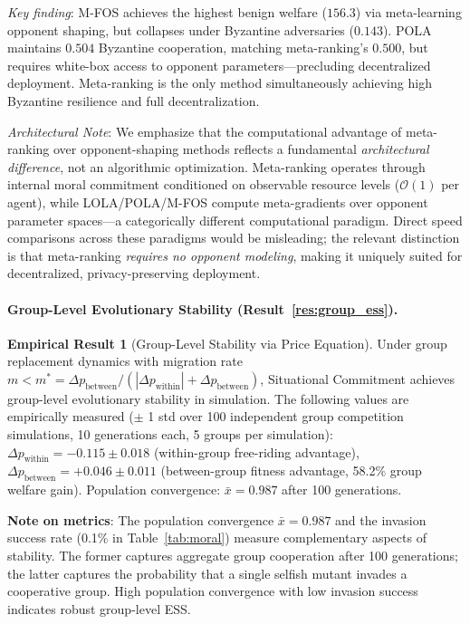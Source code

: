 \documentclass{article}
\begin{document}
\noindent\textit{Key finding}: M-FOS achieves the highest benign welfare ($156.3$) via meta-learning opponent shaping, but collapses under Byzantine adversaries ($0.143$).
POLA maintains $0.504$ Byzantine cooperation, matching meta-ranking's $0.500$, but requires white-box access to opponent parameters---precluding decentralized deployment.
Meta-ranking is the only method simultaneously achieving high Byzantine resilience and full decentralization.

\noindent\textit{Architectural Note}: We emphasize that the computational advantage of meta-ranking over opponent-shaping methods reflects a fundamental \emph{architectural difference}, not an algorithmic optimization.
Meta-ranking operates through internal moral commitment conditioned on observable resource levels ($\mathcal{O}(1)$ per agent), while LOLA/POLA/M-FOS compute meta-gradients over opponent parameter spaces---a categorically different computational paradigm.
Direct speed comparisons across these paradigms would be misleading; the relevant distinction is that meta-ranking \emph{requires no opponent modeling}, making it uniquely suited for decentralized, privacy-preserving deployment.

\paragraph{Group-Level Evolutionary Stability (Result~\ref{res:group_ess}).}

\noindent\textbf{Empirical Result 1} (Group-Level Stability via Price Equation).
\label{res:group_ess}
Under group replacement dynamics with migration rate $m < m^* = \Delta p_{\text{between}} / (|\Delta p_{\text{within}}| + \Delta p_{\text{between}})$, Situational Commitment achieves group-level evolutionary stability in simulation. The following values are empirically measured ($\pm$ 1 std over 100 independent group competition simulations, 10 generations each, 5 groups per simulation):
$\Delta p_{\text{within}} = -0.115 \pm 0.018$ (within-group free-riding advantage),
$\Delta p_{\text{between}} = +0.046 \pm 0.011$ (between-group fitness advantage, 58.2\% group welfare gain).
Population convergence: $\bar{x} = 0.987$ after 100 generations.

\noindent \textbf{Note on metrics}: The population convergence $\bar{x} = 0.987$ and the invasion success rate (0.1\% in Table~\ref{tab:moral}) measure complementary aspects of stability.
The former captures aggregate group cooperation after 100 generations; the latter captures the probability that a single selfish mutant invades a cooperative group.
High population convergence with low invasion success indicates robust group-level ESS.
\end{document}
